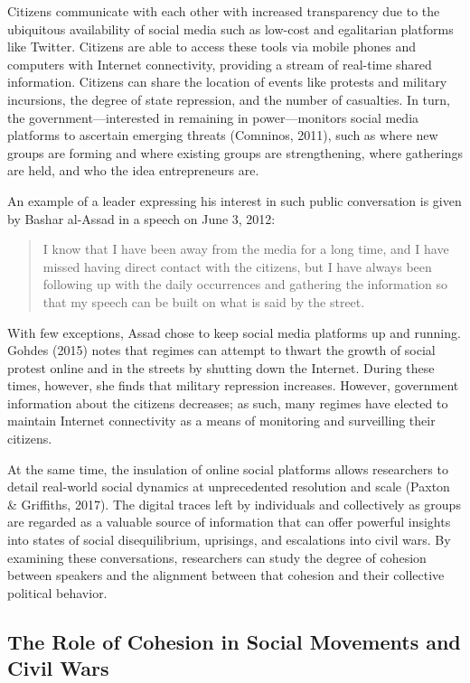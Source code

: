\documentclass[
  english,
  man]{apa6}
\begin{document}
Citizens communicate with each other with increased transparency due to the
ubiquitous availability of social media such as low-cost and egalitarian
platforms like Twitter. Citizens are able to access these tools via mobile
phones and computers with Internet connectivity, providing a stream of real-time
shared information. Citizens can share the location of events like protests and
military incursions, the degree of state repression, and the number of
casualties. In turn, the government---interested in remaining in
power---monitors social media platforms to ascertain emerging threats
(Comninos, 2011), such as where new groups are forming and where existing
groups are strengthening, where gatherings are held, and who the idea
entrepreneurs are.

An example of a leader expressing his interest in such public
conversation is given by Bashar al-Assad in a speech on June 3, 2012:

\begin{quote}
I know that I have been away from the media for a long time, and I have missed
having direct contact with the citizens, but I have always been following up
with the daily occurrences and gathering the information so that my speech can
be built on what is said by the street.
\end{quote}

\noindent With few exceptions, Assad chose to keep social media platforms up and running.
Gohdes (2015) notes that regimes can attempt to thwart the growth
of social protest online and in the streets by shutting down the Internet.
During these times, however, she finds that military repression increases.
However, government information about the citizens decreases; as such, many
regimes have elected to maintain Internet connectivity as a means of monitoring
and surveilling their citizens.

At the same time, the insulation of online social platforms allows researchers
to detail real-world social dynamics at unprecedented resolution and scale
(Paxton \& Griffiths, 2017). The digital traces left by individuals and collectively as
groups are regarded as a valuable source of information that can offer powerful
insights into states of social disequilibrium, uprisings, and escalations into
civil wars. By examining these conversations, researchers can study the degree
of cohesion between speakers and the alignment between that cohesion and their
collective political behavior.

\hypertarget{the-role-of-cohesion-in-social-movements-and-civil-wars}{%
\subsection{The Role of Cohesion in Social Movements and Civil Wars}\label{the-role-of-cohesion-in-social-movements-and-civil-wars}}
\end{document}
